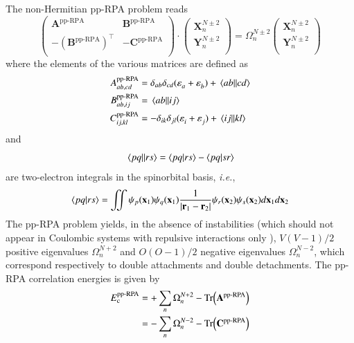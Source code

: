 \documentclass[aip,jcp,reprint,noshowkeys,superscriptaddress]{revtex4-1}
\newcommand{\ie}{\textit{i.e.}}
\newcommand{\T}[1]{#1^{\intercal}}
\newcommand{\br}{\mathbf{r}}
\newcommand{\bx}{\mathbf{x}}
\newcommand{\Nocc}{O}
\newcommand{\Nvir}{V}
\newcommand{\ppRPA}{\text{pp-RPA}}
\newcommand{\Ec}{E_\text{c}}
\newcommand{\e}[2]{\eps_{#1}^{#2}}
\newcommand{\Om}[2]{\Omega_{#1}^{#2}}
\newcommand{\SO}[1]{\psi_{#1}}
\newcommand{\bA}[2]{\mathbf{A}_{#1}^{#2}}
\newcommand{\bB}[2]{\mathbf{B}_{#1}^{#2}}
\newcommand{\bC}[2]{\mathbf{C}_{#1}^{#2}}
\newcommand{\bX}[2]{\mathbf{X}_{#1}^{#2}}
\newcommand{\bY}[2]{\mathbf{Y}_{#1}^{#2}}
\newcommand{\eps}{\varepsilon}
\begin{document}
The non-Hermitian pp-RPA problem reads \cite{Schuck_Book,vanAggelen_2013,Peng_2013,Scuseria_2013,Yang_2013,Yang_2013b,vanAggelen_2014,Yang_2014a,Zhang_2015,Zhang_2016}
\begin{equation}
\label{eq:LR-RPA}
	\begin{pmatrix}
		\bA{}{\ppRPA}			&	\bB{}{\ppRPA}	\\
		-\T{(\bB{}{\ppRPA})}	&	-\bC{}{\ppRPA}	\\
	\end{pmatrix}
	\cdot
	\begin{pmatrix}
		\bX{n}{N\pm2}	\\
		\bY{n}{N\pm2}	\\
	\end{pmatrix}
	=
	\Om{n}{N\pm2}
	\begin{pmatrix}
		\bX{n}{N\pm2}	\\
		\bY{n}{N\pm2}	\\
	\end{pmatrix}
\end{equation}
where the elements of the various matrices are defined as
\begin{subequations}
\begin{align}
	A_{ab,cd}^{\ppRPA} & = \delta_{ab} \delta_{cd} (\e{a}{} + \e{b}{}) + \mel{ab}{}{cd}
	\\ 
	B_{ab,ij}^{\ppRPA} & = \mel{ab}{}{ij}
	\\ 
	C_{ij,kl}^{\ppRPA} & = - \delta_{ik} \delta_{jl} (\e{i}{} + \e{j}{}) +\mel{ij}{}{kl}
\end{align}
\end{subequations}
and 
\begin{equation}
	\mel{pq}{}{rs} = \braket{pq}{rs} - \braket{pq}{sr}
\end{equation}
are two-electron integrals in the spinorbital basis, \ie,
\begin{equation}
	\braket{pq}{rs} = \iint \SO{p}(\bx_1) \SO{q}(\bx_1) \frac{1}{\abs{\br_1 - \br_2}} \SO{r}(\bx_2) \SO{s}(\bx_2)  d\bx_1 d\bx_2
\end{equation}
The pp-RPA problem yields, in the absence of instabilities (which should not appear in Coulombic systems with repulsive interactions only \cite{Scuseria_2013}), $\Nvir(\Nvir-1)/2$ positive eigenvalues $\Om{n}{N+2}$ and $\Nocc(\Nocc-1)/2$ negative eigenvalues $\Om{n}{N-2}$, which  correspond respectively to double attachments and double detachments.
The pp-RPA correlation energies is given by \cite{Peng_2013,Scuseria_2013}
\begin{equation}
\begin{split}
	\Ec^\ppRPA 
	& = + \sum_n \Om{n}{N+2} - \Tr(\bA{}{\ppRPA}) 
	\\
	& = - \sum_n \Om{n}{N-2} - \Tr(\bC{}{\ppRPA})
\end{split}
\end{equation}
\end{document}
